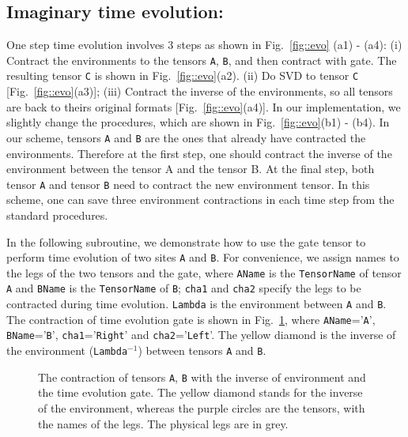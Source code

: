 \documentclass[preprint,3p,times,preprint,showpacs,amsmath,superscriptaddress,floatfix]{elsarticle}
\begin{document}
\subsection{Imaginary time evolution:}
\label{sec:ITE}


 One step time evolution involves 3 steps as shown in Fig.~\ref{fig::evo} (a1) - (a4): (i) Contract the environments to the tensors {\tt A}, {\tt B}, and then contract  with gate. The resulting tensor {\tt C} is shown in Fig.~\ref{fig::evo}(a2). (ii) Do SVD to tensor {\tt C} [Fig.~\ref{fig::evo}(a3)];
(iii) Contract the inverse of the environments, so all tensors are back to theirs original formats [Fig.~\ref{fig::evo}(a4)].
In our implementation, we slightly change the procedures, which are shown
in Fig.~\ref{fig::evo}(b1) - (b4). In our scheme, tensors {\tt A} and {\tt B} are the ones that already have contracted the environments.
Therefore at the first step, one should contract the inverse of the environment between the tensor A and the tensor B.
 At the final step, both tensor {\tt A} and tensor {\tt B} need to contract the new environment tensor.
In this scheme, one can save three environment contractions in each time step from the standard procedures.

In the following subroutine, we demonstrate how to use the gate tensor to perform time evolution of two sites {\tt A} and {\tt B}.
For convenience, we assign names to the legs of the two tensors and the gate, where
{\tt AName} is the {\tt TensorName} of tensor {\tt A} and {\tt BName} is the {\tt TensorName} of {\tt B}; {\tt cha1} and {\tt cha2} specify the legs to be contracted
during time evolution. {\tt Lambda} is the environment between {\tt A} and {\tt B}.
The contraction of time evolution gate is shown in Fig.~\ref{fig::evo2}, where {\tt AName}='{\tt A}', {\tt BName}='{\tt B}',
{\tt cha1}='{\tt Right}' and {\tt cha2}='{\tt Left}'. The yellow diamond is the inverse of the environment ({\tt Lambda}$^{-1}$) between tensors {\tt A} and {\tt B}.
%
\begin{figure} [!hbp]
		\begin{center}
		\caption{The contraction of tensors {\tt A}, {\tt B} with the inverse of environment and the time evolution gate.
The yellow diamond stands for the inverse of the environment, whereas the purple circles are the tensors, with the names of the legs. The physical legs
are in grey.}
\label{fig::evo2}
		\end{center}
\end{figure}
\end{document}
